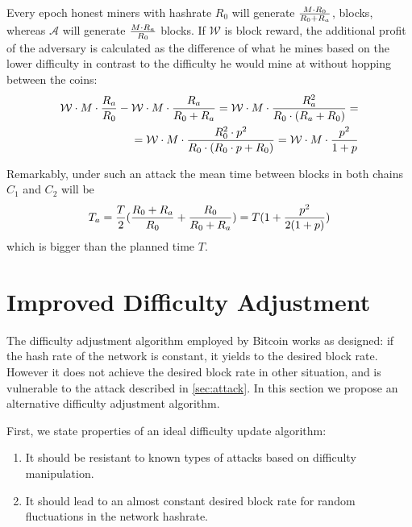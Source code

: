 \documentclass[]{llncs}
\newcommand{\reward}{\mathcal{W}}
\newcommand{\coinA}{$C_1$}
\newcommand{\coinB}{$C_2$}
\begin{document}
Every epoch honest miners with hashrate $R_0$ will generate $M \cdot R_0 \over R_0 + R_a$, blocks, whereas $\mathcal{A}$ will generate $M \cdot R_a \over R_0$ blocks.
If $\reward$ is block reward, the additional profit of the adversary is calculated as the difference of what he mines based on the lower difficulty in contrast to the difficulty he would mine at without hopping between the coins:
\begin{equation}
\begin{aligned}
{\reward \cdot M \cdot { R_a \over R_0} - \reward \cdot M \cdot { R_a \over R_0 + R_a}}  
= {\reward \cdot M \cdot { R_a^2 \over R_0 \cdot (R_a + R_0) }} = \\
= {\reward \cdot M \cdot {R_0^2 \cdot p^2 \over R_0 \cdot (R_0 \cdot p + R_0)}} 
= {\reward \cdot M \cdot { p^2 \over 1+p }}
\end{aligned}
\end{equation}

Remarkably, under such an attack the mean time between blocks in both chains \coinA{} and \coinB{} will be
\begin{equation}
\label{eq:ati}
{T_a={T\over 2}({R_0+R_a\over R_0} + {R_0 \over R_0+R_a}) = T(1 + {p^2\over 2(1+p)})}
\end{equation}
which is bigger than the planned time $T$.


\section{Improved Difficulty Adjustment}
\label{sec:improved}

The difficulty adjustment algorithm employed by Bitcoin works as designed: if the hash rate of the network is constant, it yields to the desired block rate. However it does not achieve the desired block rate in other situation, and is vulnerable to the attack described in \ref{sec:attack}.
In this section we propose an alternative difficulty adjustment algorithm.

First, we state properties of an ideal difficulty update algorithm:
\begin{enumerate}
\item{It should be resistant to known types of attacks based on difficulty manipulation.}
\item{It should lead to an almost constant desired block rate for random fluctuations in the network hashrate.}
\end{enumerate}
\end{document}
